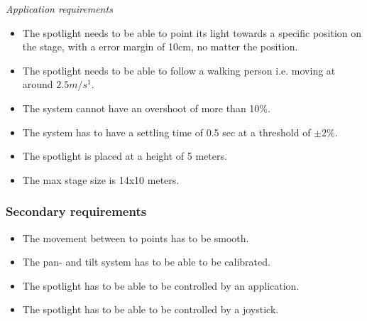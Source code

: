 \textit{Application requirements}

\begin{itemize}
\item The spotlight needs to be able to point its light towards a specific position on the stage, with a error margin of 10cm, no matter the position.

\item The spotlight needs to be able to follow a walking person i.e. moving at around $2.5 m/s^{1}$.

\item The system cannot have an overshoot of more than 10\%.

\item The system has to have a settling time of 0.5 sec at a threshold of $\pm$2\%.

\item The spotlight is placed at a height of 5 meters.

\item The max stage size is 14x10 meters.
\end{itemize}


\subsubsection{Secondary requirements}

\begin{itemize}
\item The movement between to points has to be smooth.

\item The pan- and tilt system has to be able to be calibrated.

\item The spotlight has to be able to be controlled by an application.

\item The spotlight has to be able to be controlled by a joystick.
\end{itemize}